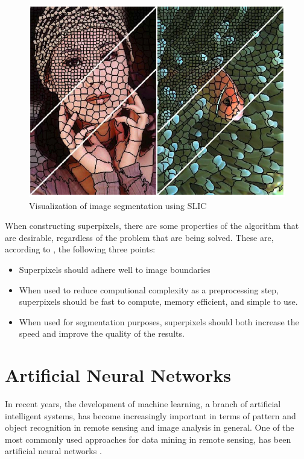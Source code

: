 \begin{figure}[!h]
	\centering
	\includegraphics[scale=0.3]{fig/superpixels}
	\caption{Visualization of image segmentation using SLIC \citep{Achanta2012}}
	\label{fig:superpixels}
\end{figure}

When constructing superpixels, there are some properties of the algorithm that are desirable, regardless of the problem that are being solved. These are, according to \citep{Achanta2012}, the following three points:

\begin{itemize}
	\item Superpixels should adhere well to image boundaries
	\item When used to reduce computional complexity as a preprocessing step, superpixels should be fast to compute, memory efficient, and simple to use.
	\item When used for segmentation purposes, superpixels should both increase the speed and improve the quality of the results.
\end{itemize}

\section{Artificial Neural Networks}
In recent years, the development of machine learning, a branch of artificial intelligent systems, has become increasingly important in terms of pattern and object recognition in remote sensing and image analysis in general. One of the most commonly used approaches for data mining in remote sensing, has been artificial neural networks \cite{Lary2016}.

